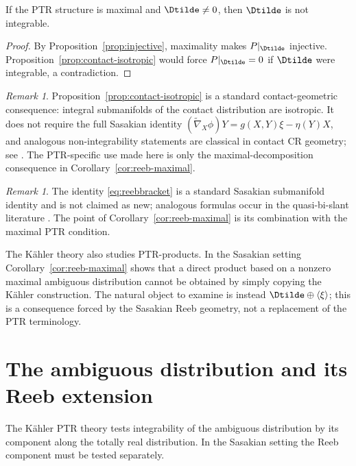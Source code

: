 \documentclass[11pt]{article}
\theoremstyle{definition}\newtheorem{definition}[theorem]{Definition}\newtheorem{example}[theorem]{Example}
\theoremstyle{remark}\newtheorem{remark}[theorem]{Remark}
\begin{document}
\begin{corollary}\label{cor:reeb-maximal}
If the PTR structure is maximal and \(\Dtilde\ne0\), then
\(\Dtilde\) is not integrable.
\end{corollary}

\begin{proof}
By Proposition~\ref{prop:injective}, maximality makes
\(P|_{\Dtilde}\) injective.  Proposition~\ref{prop:contact-isotropic}
would force \(P|_{\Dtilde}=0\) if \(\Dtilde\) were integrable, a
contradiction.
\end{proof}

\begin{remark}
Proposition~\ref{prop:contact-isotropic} is a standard contact-geometric
consequence: integral submanifolds of the contact distribution are
isotropic.  It does not require the full Sasakian identity
\((\widetilde\nabla_X\phi)Y=g(X,Y)\xi-\eta(Y)X\), and analogous
non-integrability statements are classical in contact CR geometry; see
\cite{Blair2010,Matsumoto1983}.  The PTR-specific use made here is only
the maximal-decomposition consequence in
Corollary~\ref{cor:reeb-maximal}.
\end{remark}

\begin{remark}
The identity \eqref{eq:reebbracket} is a standard Sasakian submanifold identity and is not claimed as new; analogous formulas occur in the quasi-bi-slant literature \cite{PrasadVerma2021}. The point of Corollary~\ref{cor:reeb-maximal} is its combination with the maximal PTR condition.
\end{remark}

The K\"ahler theory also studies PTR-products. In the Sasakian setting Corollary~\ref{cor:reeb-maximal} shows that a direct product based on a nonzero maximal ambiguous distribution cannot be obtained by simply copying the K\"ahler construction. The natural object to examine is instead $\Dtilde\oplus\langle\xi\rangle$; this is a consequence forced by the Sasakian Reeb geometry, not a replacement of the PTR terminology.


\section{The ambiguous distribution and its Reeb extension}
The K\"ahler PTR theory tests integrability of the ambiguous distribution by its component along the totally real distribution. In the Sasakian setting the Reeb component must be tested separately.
\end{document}
